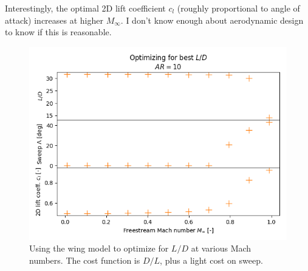 \documentclass[12pt]{article}
\begin{document}
Interestingly, the optimal 2D lift coefficient $c_l$ (roughly proportional to angle of attack) increases at higher $M_\infty$. I don't know enough about aerodynamic design to know if this is reasonable.

\begin{figure}[hbt!]
    \centering
    \includegraphics[width=\textwidth]{figures/wing_best_ld/best_ld}
    \caption{\label{fig:wing_best_ld} Using the wing model to optimize for $L/D$ at various Mach numbers. The cost function is $D/L$, plus a light cost on sweep.}
\end{figure}


\printbibliography
\end{document}
